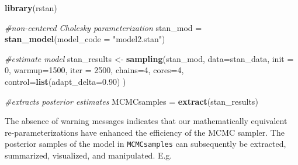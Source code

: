 \documentclass[
]{book}
\newenvironment{Shaded}{\begin{snugshade}}{\end{snugshade}}
\newcommand{\CommentTok}[1]{\textcolor[rgb]{0.56,0.35,0.01}{\textit{#1}}}
\newcommand{\DataTypeTok}[1]{\textcolor[rgb]{0.13,0.29,0.53}{#1}}
\newcommand{\DecValTok}[1]{\textcolor[rgb]{0.00,0.00,0.81}{#1}}
\newcommand{\FloatTok}[1]{\textcolor[rgb]{0.00,0.00,0.81}{#1}}
\newcommand{\KeywordTok}[1]{\textcolor[rgb]{0.13,0.29,0.53}{\textbf{#1}}}
\newcommand{\NormalTok}[1]{#1}
\newcommand{\OperatorTok}[1]{\textcolor[rgb]{0.81,0.36,0.00}{\textbf{#1}}}
\newcommand{\StringTok}[1]{\textcolor[rgb]{0.31,0.60,0.02}{#1}}
\begin{document}
\begin{Shaded}
\begin{Highlighting}[]
\KeywordTok{library}\NormalTok{(rstan)}

\CommentTok{#non-centered Cholesky parameterization}
\NormalTok{stan_mod =}\StringTok{ }\KeywordTok{stan_model}\NormalTok{(}\DataTypeTok{model_code =} \StringTok{"model2.stan"}\NormalTok{)}

\CommentTok{#estimate model}
\NormalTok{stan_results <-}\StringTok{ }\KeywordTok{sampling}\NormalTok{(stan_mod, }\DataTypeTok{data=}\NormalTok{stan_data, }\DataTypeTok{init =} \DecValTok{0}\NormalTok{, }\DataTypeTok{warmup=}\DecValTok{1500}\NormalTok{, }\DataTypeTok{iter =} \DecValTok{2500}\NormalTok{,}
                         \DataTypeTok{chains=}\DecValTok{4}\NormalTok{, }\DataTypeTok{cores=}\DecValTok{4}\NormalTok{, }\DataTypeTok{control=}\KeywordTok{list}\NormalTok{(}\DataTypeTok{adapt_delta=}\FloatTok{0.90}\NormalTok{) )}

\CommentTok{#extracts posterior estimates}
\NormalTok{MCMCsamples =}\StringTok{  }\KeywordTok{extract}\NormalTok{(stan_results)}
\end{Highlighting}
\end{Shaded}

The absence of warning messages indicates that our mathematically equivalent re-parameterizations have enhanced the efficiency of the MCMC sampler. The posterior samples of the model in \texttt{MCMCsamples} can subsequently be extracted, summarized, visualized, and manipulated. E.g.

\begin{Shaded}
\end{Shaded}
\end{document}
